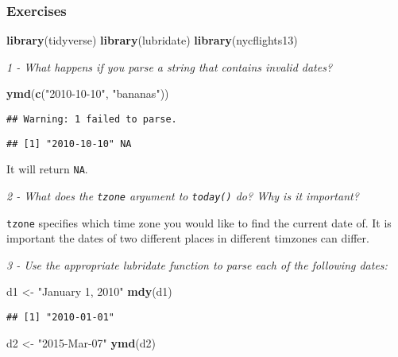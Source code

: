 \documentclass[]{article}
\newenvironment{Shaded}{\begin{snugshade}}{\end{snugshade}}
\newcommand{\KeywordTok}[1]{\textcolor[rgb]{0.13,0.29,0.53}{\textbf{#1}}}
\newcommand{\StringTok}[1]{\textcolor[rgb]{0.31,0.60,0.02}{#1}}
\newcommand{\NormalTok}[1]{#1}
\theoremstyle{definition}
\theoremstyle{definition}
\theoremstyle{definition}
\theoremstyle{remark}
\begin{document}
\subsubsection{Exercises}\label{exercises-40}

\begin{Shaded}
\begin{Highlighting}[]
\KeywordTok{library}\NormalTok{(tidyverse)}
\KeywordTok{library}\NormalTok{(lubridate)}
\KeywordTok{library}\NormalTok{(nycflights13)}
\end{Highlighting}
\end{Shaded}

\emph{1 - What happens if you parse a string that contains invalid
dates?}

\begin{Shaded}
\begin{Highlighting}[]
\KeywordTok{ymd}\NormalTok{(}\KeywordTok{c}\NormalTok{(}\StringTok{"2010-10-10"}\NormalTok{, }\StringTok{"bananas"}\NormalTok{))}
\end{Highlighting}
\end{Shaded}

\begin{verbatim}
## Warning: 1 failed to parse.
\end{verbatim}

\begin{verbatim}
## [1] "2010-10-10" NA
\end{verbatim}

It will return \texttt{NA}.

\emph{2 - What does the \texttt{tzone} argument to \texttt{today()} do?
Why is it important?}

\texttt{tzone} specifies which time zone you would like to find the
current date of. It is important the dates of two different places in
different timzones can differ.

\emph{3 - Use the appropriate lubridate function to parse each of the
following dates:}

\begin{Shaded}
\begin{Highlighting}[]
\NormalTok{d1 <-}\StringTok{ "January 1, 2010"}
\KeywordTok{mdy}\NormalTok{(d1)}
\end{Highlighting}
\end{Shaded}

\begin{verbatim}
## [1] "2010-01-01"
\end{verbatim}

\begin{Shaded}
\begin{Highlighting}[]
\NormalTok{d2 <-}\StringTok{ "2015-Mar-07"}
\KeywordTok{ymd}\NormalTok{(d2)}
\end{Highlighting}
\end{Shaded}
\end{document}
